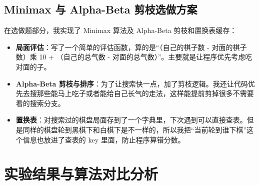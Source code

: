 \documentclass[12pt,a4paper,UTF8]{ctexart}
\begin{document}
\subsection{Minimax 与 Alpha-Beta 剪枝选做方案}
在选做题部分，我实现了 Minimax 算法及 Alpha-Beta 剪枝和置换表缓存：
\begin{itemize}
    \item \textbf{局面评估}：写了一个简单的评估函数，算的是“（自己的棋子数 - 对面的棋子数）乘 10 + （自己的总气数 - 对面的总气数）”。主要就是让程序优先考虑吃对面的子。
    \item \textbf{Alpha-Beta 剪枝与排序}：为了让搜索快一点，加了剪枝逻辑。我还让代码优先去搜那些能马上吃子或者能给自己长气的走法，这样能提前剪掉很多不需要看的搜索分支。
    \item \textbf{置换表}：对搜索过的棋盘局面存到了一个字典里，下次遇到可以直接查表。但是同样的棋盘轮到黑棋下和白棋下是不一样的，所以我把“当前轮到谁下棋”这个信息也放进了查表的 key 里面，防止程序算错分数。
\end{itemize}

\section{实验结果与算法对比分析}
\end{document}
